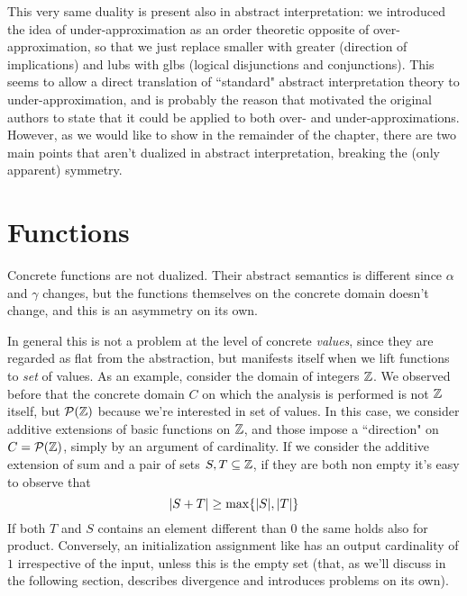 This very same duality is present also in abstract interpretation: we introduced the idea of under-approximation as an order theoretic opposite of over-approximation, so that we just replace smaller with greater (direction of implications) and lubs with glbs (logical disjunctions and conjunctions).
This seems to  allow a direct translation of ``standard" abstract interpretation theory to under-approximation, and is probably the reason that motivated the original authors to state that it could be applied to both over- and under-approximations. However, as we would like to show in the remainder of the chapter, there are two main points that aren't dualized in abstract interpretation, breaking the (only apparent) symmetry.

\section{Functions}
Concrete functions are not dualized. Their abstract semantics is different since $\alpha$ and $\gamma$ changes, but the functions themselves on the concrete domain doesn't change, and this is an asymmetry on its own.

In general this is not a problem at the level of concrete \textit{values}, since they are regarded as flat from the abstraction, but manifests itself when we lift functions to \textit{set} of values.
As an example, consider the domain of integers $\mathbb{Z}$. We observed before that the concrete domain $C$ on which the analysis is performed is not $\mathbb{Z}$ itself, but $\mathcal{P}(\mathbb{Z})$ because we're interested in set of values. In this case, we consider additive extensions of basic functions on $\mathbb{Z}$, and those impose a ``direction" on $C = \mathcal{P}(\mathbb{Z})$, simply by an argument of cardinality.
If we consider the additive extension of sum and a pair of sets $S, T \subseteq \mathbb{Z}$, if they are both non empty it's easy to observe that
\[
\lvert S + T\rvert \ge \max\{ \lvert S\rvert, \lvert T\rvert \}
\]
If both $T$ and $S$ contains an element different than $0$ the same holds also for product.
Conversely, an initialization assignment like  has an output cardinality of $1$ irrespective of the input, unless this is the empty set (that, as we'll discuss in the following section, describes divergence and introduces problems on its own).

